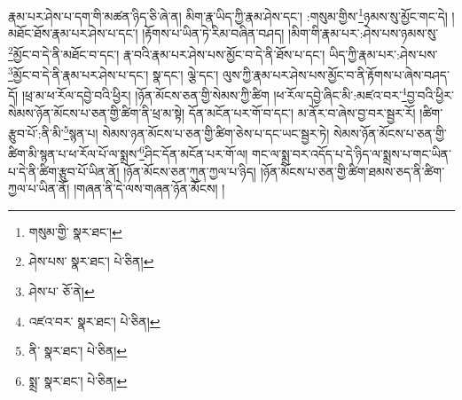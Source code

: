 རྣམ་པར་ཤེས་པ་དག་གི་མཚན་ཉིད་ཅི་ཞེ་ན། མིག་རྣ་ཡིད་ཀྱི་རྣམ་ཤེས་དང་། :གསུམ་གྱིས་\footnote{གསུམ་གྱི་  སྣར་ཐང་། }ཉམས་སུ་མྱོང་གང་དེ། །མཐོང་ཐོས་རྣམ་པར་ཤེས་པ་དང་། །རྟོགས་པ་ཡིན་ཏེ་རིམ་བཞིན་བཤད། །མིག་གི་རྣམ་པར་:ཤེས་པས་ཉམས་སུ་\footnote{ཤེས་པས་  སྣར་ཐང་།  པེ་ཅིན། }མྱོང་བ་དེ་ནི་མཐོང་བ་དང་། རྣ་བའི་རྣམ་པར་ཤེས་པས་མྱོང་བ་དེ་ནི་ཐོས་པ་དང་། ཡིད་ཀྱི་རྣམ་པར་:ཤེས་པས་\footnote{ཤེས་པ་  ཅོ་ནེ། }མྱོང་བ་དེ་ནི་རྣམ་པར་ཤེས་པ་དང་། སྣ་དང་། ལྕེ་དང་། ལུས་ཀྱི་རྣམ་པར་ཤེས་པས་མྱོང་བ་ནི་རྟོགས་པ་ཞེས་བཤད་དོ། །ཕྲ་མ་ཕ་རོལ་དབྱེ་བའི་ཕྱིར། །ཉོན་མོངས་ཅན་གྱི་སེམས་ཀྱི་ཚིག །ཕ་རོལ་དབྱེ་ཞིང་མི་:མཛའ་བར་\footnote{འཛའ་བར་  སྣར་ཐང་།  པེ་ཅིན། }བྱ་བའི་ཕྱིར་སེམས་ཉོན་མོངས་པ་ཅན་གྱི་ཚིག་ནི་ཕྲ་མ་སྟེ། དོན་མངོན་པར་གོ་བ་དང་། མ་ནོར་བ་ཞེས་བྱ་བར་སྦྱར་རོ། །ཚིག་རྩུབ་པོ་:ནི་མི་\footnote{ནི་  སྣར་ཐང་།  པེ་ཅིན། }སྙན་པ། སེམས་ཉན་མོངས་པ་ཅན་གྱི་ཚིག་ཅེས་པ་དང་ཡང་སྦྱར་ཏེ། སེམས་ཉོན་མོངས་པ་ཅན་གྱི་ཚིག་མི་སྙན་པ་ཕ་རོལ་པོ་ལ་སྨྲས་\footnote{སྨྲ་  སྣར་ཐང་།  པེ་ཅིན། }ཤིང་དོན་མངོན་པར་གོ་ལ། གང་ལ་སྨྲ་བར་འདོད་པ་དེ་ཉིད་ལ་སྨྲས་པ་གང་ཡིན་པ་དེ་ནི་ཚིག་རྩུབ་པོ་ཡིན་ནོ། །ཉོན་མོངས་ཅན་ཀུན་ཀྱལ་པ་ཉིད། །ཉོན་མོངས་པ་ཅན་གྱི་ཚིག་ཐམས་ཅད་ནི་ཚིག་ཀྱལ་པ་ཡིན་ནོ། །གཞན་ནི་དེ་ལས་གཞན་ཉོན་མོངས། །
